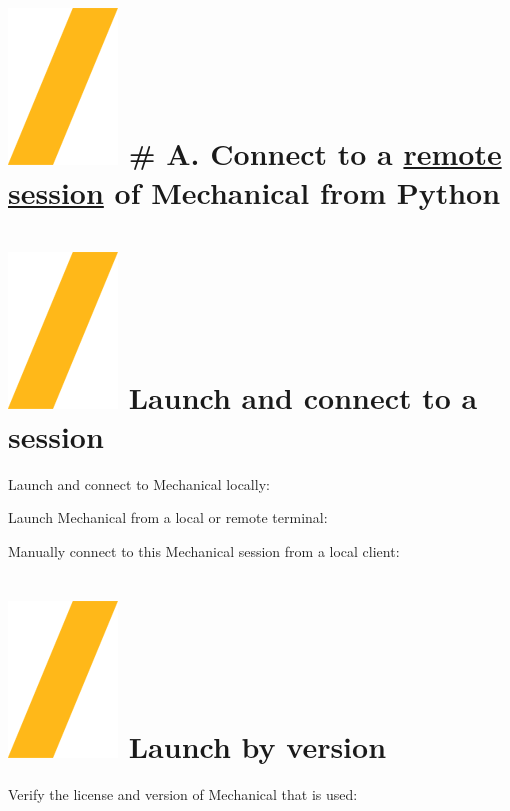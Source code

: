 \documentclass[9pt,landscape]{article}
\begin{document}
\begin{multicols}{3}
\setlength{\premulticols}{1pt}
\setlength{\postmulticols}{1pt}
\setlength{\multicolsep}{1pt}
\setlength{\columnsep}{2pt}

\vfill
\section{\includegraphics[height=\fontcharht\font`\S]{slash.png} # A. Connect to a \underline{remote session} of Mechanical from Python}


\section{\includegraphics[height=\fontcharht\font`\S]{slash.png} Launch and connect to a session}
Launch and connect to Mechanical locally:

Launch Mechanical from a local or remote terminal:

Manually connect to this Mechanical session from a local client:



\section{\includegraphics[height=\fontcharht\font`\S]{slash.png} Launch by version}
Verify the license and version of Mechanical that is used:


\end{multicols}
\end{document}
